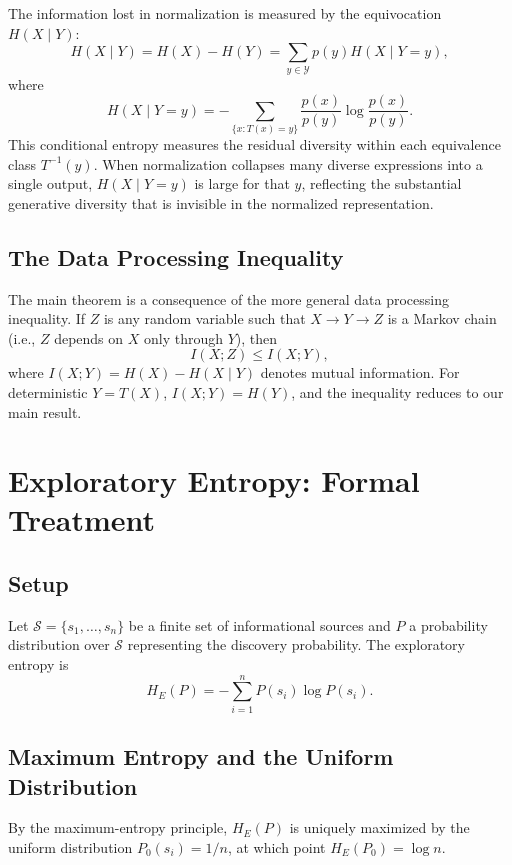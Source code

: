 \documentclass[12pt,a4paper]{article}
\theoremstyle{definition}
\theoremstyle{plain}
\theoremstyle{remark}
\newcommand{\HE}{H_{E}}
\newcommand{\calS}{\mathcal{S}}
\newcommand{\calY}{\mathcal{Y}}
\begin{document}
The information lost in normalization is measured by the equivocation $H(X \mid Y)$:
\[
H(X \mid Y) = H(X) - H(Y) = \sum_{y \in \calY} p(y) H(X \mid Y = y),
\]
where
\[
H(X \mid Y = y) = -\sum_{\{x : T(x) = y\}} \frac{p(x)}{p(y)} \log \frac{p(x)}{p(y)}.
\]
This conditional entropy measures the residual diversity within each equivalence class
$T^{-1}(y)$. When normalization collapses many diverse expressions into a single output,
$H(X \mid Y = y)$ is large for that $y$, reflecting the substantial generative diversity
that is invisible in the normalized representation.

\subsection{The Data Processing Inequality}

The main theorem is a consequence of the more general data processing inequality. If $Z$ is
any random variable such that $X \to Y \to Z$ is a Markov chain (i.e., $Z$ depends on $X$
only through $Y$), then
\[
I(X; Z) \leq I(X; Y),
\]
where $I(X; Y) = H(X) - H(X \mid Y)$ denotes mutual information. For deterministic $Y = T(X)$,
$I(X; Y) = H(Y)$, and the inequality reduces to our main result.

\section{Exploratory Entropy: Formal Treatment}
\label{app:exploratory}

\subsection{Setup}

Let $\calS = \{s_1, \ldots, s_n\}$ be a finite set of informational sources and $P$ a
probability distribution over $\calS$ representing the discovery probability. The exploratory
entropy is
\[
\HE(P) = -\sum_{i=1}^n P(s_i) \log P(s_i).
\]

\subsection{Maximum Entropy and the Uniform Distribution}

By the maximum-entropy principle, $\HE(P)$ is uniquely maximized by the uniform distribution
$P_0(s_i) = 1/n$, at which point $\HE(P_0) = \log n$.
\end{document}
